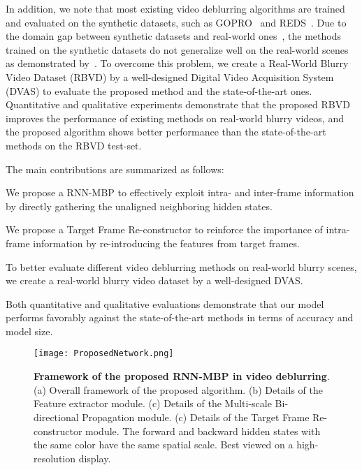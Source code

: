 \documentclass[letterpaper]{article} \usepackage{aaai22}  \usepackage{times}  \usepackage{helvet}  \usepackage{courier}  \usepackage[hyphens]{url}  \usepackage{graphicx} \urlstyle{rm} \def\UrlFont{\rm}  \usepackage{natbib}  \usepackage{caption} \DeclareCaptionStyle{ruled}{labelfont=normalfont,labelsep=colon,strut=off} \frenchspacing  \setlength{\pdfpagewidth}{8.5in}  \setlength{\pdfpageheight}{11in}  \newcommand{\hang}{\textcolor[rgb]{0.98,0.5,0.04}}
\begin{document}
In addition, we note that most existing video deblurring algorithms are trained and evaluated on the synthetic datasets, such as GOPRO~\cite{deepdeblur} and REDS~\cite{REDS}.
Due to the domain gap between synthetic datasets and real-world ones~\cite{8953368}, the methods trained on the synthetic datasets do not generalize well on the real-world scenes as demonstrated by~\cite{lai_blur, kohler, RealBlur, ESTRNN}.
To overcome this problem, we create a Real-World Blurry Video Dataset (RBVD) by a well-designed Digital Video Acquisition System (DVAS) to evaluate the proposed method and the state-of-the-art ones.
Quantitative and qualitative experiments demonstrate that the proposed RBVD improves the performance of existing methods on real-world blurry videos, and the proposed algorithm shows better performance than the state-of-the-art methods on the RBVD test-set. 


The main contributions are summarized as follows:
\begin{compactitem}
    \item We propose a RNN-MBP to effectively exploit intra- and inter-frame information by directly gathering the unaligned neighboring hidden states.
\item We propose a Target Frame Re-constructor to reinforce the importance of intra-frame information by re-introducing the features from target frames.
\item To better evaluate different video deblurring methods on real-world blurry scenes, we create a real-world blurry video dataset by a well-designed DVAS.
\item Both quantitative and qualitative evaluations demonstrate that our model performs favorably against the state-of-the-art methods in terms of accuracy and model size.
\end{compactitem}



\begin{figure*}[!t] 
    \centering
    \texttt{[image: ProposedNetwork.png]}
    \vspace{-2mm}
    \caption{\textbf{Framework of the proposed RNN-MBP in video deblurring}. (a) Overall framework of the proposed algorithm. (b) Details of the Feature extractor module. (c) Details of the Multi-scale Bi-directional Propagation module. (c) Details of the Target Frame Re-constructor module. 
The forward and backward hidden states with the same color have the same spatial scale. 
Best viewed on a high-resolution display.}
    \label{fig:RNN}
        \vspace{-4mm}
\end{figure*}
\end{document}
